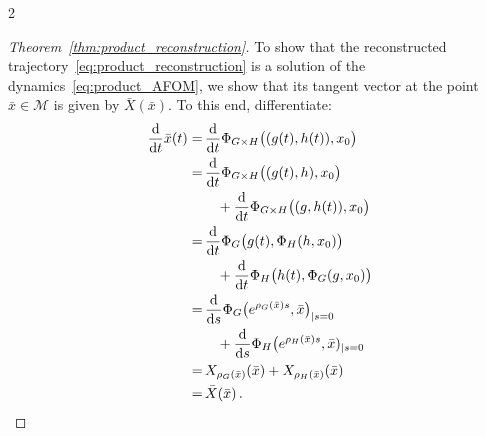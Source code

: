 \documentclass{article}
\newtheorem{proof}{Proof}[theorem]
\newcommand{\M}{\mathcal{M}}                                %
\newcommand{\appX}{\bar{X}}
\newcommand{\state}{x}
\newcommand{\appstate}{\bar{x}}
\begin{document}
\begin{multicols}{2}

\begin{proof}[Theorem~\ref{thm:product_reconstruction}]
    To show that the reconstructed trajectory~\eqref{eq:product_reconstruction} is a solution of the dynamics~\eqref{eq:product_AFOM},
    we show that its tangent vector at the point $\appstate \in \M$ is given by $\bar{X}(\appstate)$. To this end, differentiate: %
    \begin{align}
        \frac{\textnormal{d}}{\textnormal{d}t} \appstate(t)
        = &\, 
        \frac{\textnormal{d}}{\textnormal{d}t} \Phi_{G\times H}\big((g(t),h(t)),\state_0\big) \\ 
        = &\, \frac{\textnormal{d}}{\textnormal{d}t} \Phi_{G\times H}\big((g(t),h),\state_0\big) \nonumber \\
        &\quad + \frac{\textnormal{d}}{\textnormal{d}t} \Phi_{G\times H}\big((g,h(t)),\state_0\big) \nonumber \\
        = &\, \frac{\textnormal{d}}{\textnormal{d}t} \Phi_G\big(g(t),\Phi_H(h,\state_0)\big) \nonumber \\
        &\quad + \frac{\textnormal{d}}{\textnormal{d}t} \Phi_H\big(h(t),\Phi_G(g,\state_0)\big) \nonumber \\
        = &\, \frac{\textnormal{d}}{\textnormal{d}s} \Phi_G\big(e^{\rho_G(\appstate)s},\appstate\big)_{|s=0} \nonumber \\
        &\quad + \frac{\textnormal{d}}{\textnormal{d}s} \Phi_H\big(e^{\rho_H(\appstate)s},\appstate)_{|s=0} \nonumber \\
        = &\,  X_{\rho_G(\appstate)}(\appstate) + X_{\rho_H(\appstate)}(\appstate)\nonumber \\
        = &\, \appX(\appstate)\,. \nonumber
    \end{align}

\end{proof}
\end{multicols}
\end{document}
